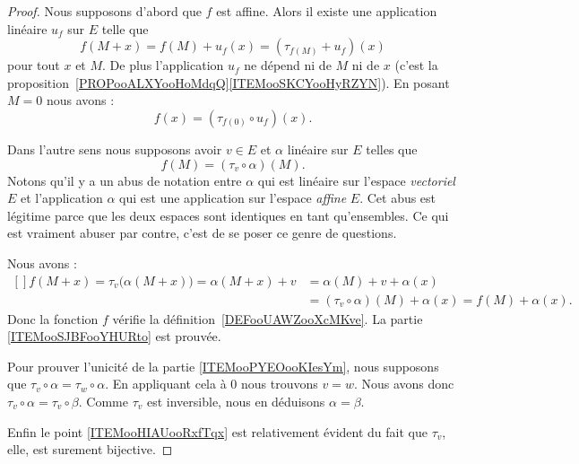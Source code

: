 \begin{proof}
    Nous supposons d'abord que \( f\) est affine. Alors il existe une application linéaire \( u_f\) sur \( E\) telle que
    \begin{equation}
        f(M+x)=f(M)+u_f(x)=(\tau_{f(M)}+u_f)(x)
    \end{equation}
    pour tout \( x\) et \( M\). De plus l'application \( u_f\) ne dépend ni de \( M\) ni de \( x\) (c'est la proposition~\ref{PROPooALXYooHoMdqQ}\ref{ITEMooSKCYooHyRZYN}). En posant \( M=0\) nous avons :
    \begin{equation}
        f(x)=(\tau_{f(0)}\circ u_f)(x).
    \end{equation}

    Dans l'autre sens nous supposons avoir \( v\in E\) et \( \alpha\) linéaire sur \( E\) telles que
    \begin{equation}
        f(M)=(\tau_v\circ\alpha)(M).
    \end{equation}
    Notons qu'il y a un abus de notation entre \( \alpha\) qui est linéaire sur l'espace \emph{vectoriel} \( E\) et l'application \( \alpha\) qui est une application sur l'espace \emph{affine} \( E\). Cet abus est légitime parce que les deux espaces sont identiques en tant qu'ensembles. Ce qui est vraiment abuser par contre, c'est de se poser ce genre de questions.

    Nous avons :
    \begin{equation}
        \begin{aligned}[]
            f(M+x)=\tau_v\big( \alpha(M+x) \big)=\alpha(M+x)+v&=\alpha(M)+v+\alpha(x)
            \\&=(\tau_v\circ\alpha)(M)+\alpha(x)=f(M)+\alpha(x).
        \end{aligned}
    \end{equation}
    Donc la fonction \( f\) vérifie la définition~\ref{DEFooUAWZooXcMKve}. La partie \ref{ITEMooSJBFooYHURto} est prouvée.

    Pour prouver l'unicité de la partie \ref{ITEMooPYEOooKIesYm}, nous supposons que \( \tau_v\circ\alpha=\tau_w\circ \alpha\). En appliquant cela à \( 0\) nous trouvons \( v=w\). Nous avons donc \( \tau_v\circ \alpha=\tau_v\circ\beta\). Comme \( \tau_v\) est inversible, nous en déduisons \( \alpha=\beta\).

    Enfin le point \ref{ITEMooHIAUooRxfTqx} est relativement évident du fait que \( \tau_v\), elle, est surement bijective.
\end{proof}

